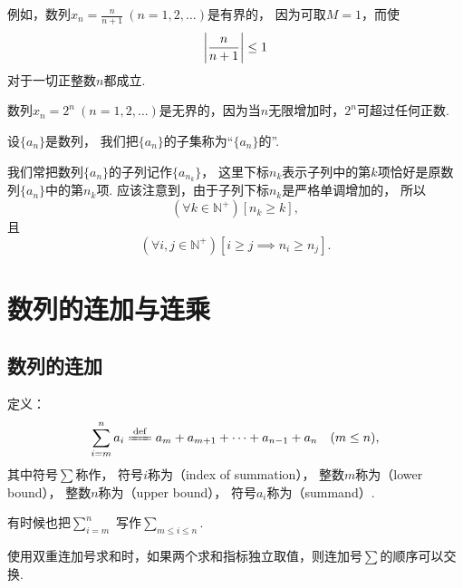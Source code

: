 例如，数列\(x_n = \frac{n}{n+1}\ (n=1,2,\dotsc)\)是有界的，
因为可取\(M=1\)，而使\[
	\abs{\frac{n}{n+1}} \leq 1
\]对于一切正整数\(n\)都成立.

数列\(x_n = 2^n\ (n=1,2,\dotsc)\)是无界的，因为当\(n\)无限增加时，\(2^n\)可超过任何正数.

\begin{definition}
设\(\{a_n\}\)是数列，
我们把\(\{a_n\}\)的子集称为“\(\{a_n\}\)的”.
\end{definition}
我们常把数列\(\{a_n\}\)的子列记作\(\{a_{n_k}\}\)，
这里下标\(n_k\)表示子列中的第\(k\)项恰好是原数列\(\{a_n\}\)中的第\(n_k\)项.
应该注意到，由于子列下标\(n_k\)是严格单调增加的，
所以\[
	(\forall k\in\mathbb{N}^+)
	[n_k \geq k],
\]
且\[
	(\forall i,j\in\mathbb{N}^+)
	[i \geq j \implies n_i \geq n_j].
\]

\section{数列的连加与连乘}
\subsection{数列的连加}
\begin{definition}[连加]
定义：\[
	\sum_{i=m}^n a_i
	\defeq
	a_m + a_{m+1} + \dotsb + a_{n-1} + a_n
	\quad(m \leq n),
\]其中符号\(\sum\)称作，
符号\(i\)称为（index of summation），
整数\(m\)称为（lower bound），
整数\(n\)称为（upper bound），
符号\(a_i\)称为（summand）.
\end{definition}

\begin{figure}[ht]
	\centering
	\caption{}
\end{figure}

有时候也把\(\sum_{i=m}^n\)%
写作\(\sum_{m \leq i \leq n}\).

使用双重连加号求和时，如果两个求和指标独立取值，则连加号\(\sum\)的顺序可以交换.

